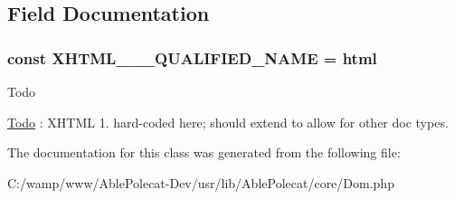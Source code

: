 \subsection{Field Documentation}
\hypertarget{class_able_polecat___dom_a9687e5f2a0ad8e40fbf6de213dc8e077}{}
\subsubsection[{X\+H\+T\+M\+L\+\_\+1\+\_\+1\+\_\+\+Q\+U\+A\+L\+I\+F\+I\+E\+D\+\_\+\+N\+A\+M\+E}]{\setlength{\rightskip}{0pt plus 5cm}const X\+H\+T\+M\+L\+\_\+\_\+\_\+\+Q\+U\+A\+L\+I\+F\+I\+E\+D\+\_\+\+N\+A\+M\+E = \textquotesingle{}html\textquotesingle{}}\label{class_able_polecat___dom_a9687e5f2a0ad8e40fbf6de213dc8e077}
\begin{DoxyRefDesc}{Todo}
\item[\hyperlink{todo__todo000003}{Todo}]\+: X\+H\+T\+M\+L 1. hard-\/coded here; should extend to allow for other doc types. \end{DoxyRefDesc}


The documentation for this class was generated from the following file\+:\begin{DoxyCompactItemize}
\item 
C\+:/wamp/www/\+Able\+Polecat-\/\+Dev/usr/lib/\+Able\+Polecat/core/Dom.\+php\end{DoxyCompactItemize}
